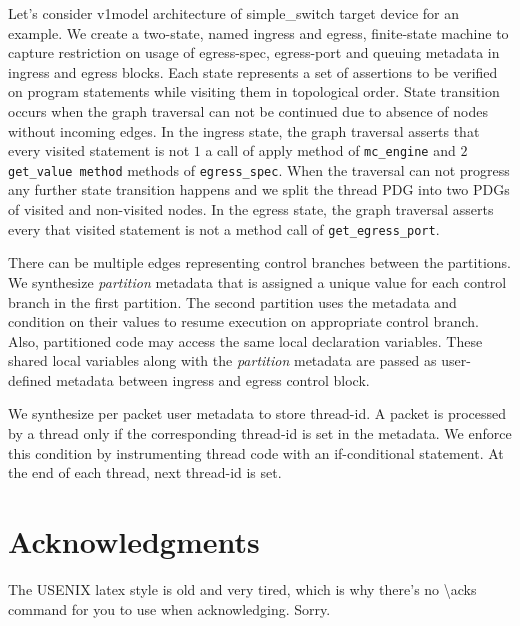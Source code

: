 Let's consider v1model architecture of simple\_switch target device for an example.
We create a two-state, named ingress and egress, finite-state machine to capture restriction on usage of egress-spec, egress-port and queuing metadata in ingress and egress blocks.
Each state represents a set of assertions to be verified on program statements while visiting them in topological order.
State transition occurs when the graph traversal can not be continued due to absence of nodes without incoming edges.
In the ingress state, the graph traversal asserts that every visited statement is not $1$ a call of apply method of \texttt{mc\_engine}  and $2$ \texttt{get\_value method} methods of \texttt{egress\_spec}.
When the traversal can not progress any further state transition happens and we split the thread PDG into two PDGs of visited and non-visited nodes.
In the egress state, the graph traversal asserts every that visited statement is not a method call of \texttt{get\_egress\_port}.

There can be multiple edges representing control branches between the partitions.
We synthesize \emph{partition} metadata that is assigned a unique value for each control branch in the first partition.
The second partition uses the metadata and condition on their values to resume execution on appropriate control branch.
Also, partitioned code may access the same local declaration variables.
These shared local variables along with the \emph{partition} metadata are passed as user-defined metadata between ingress and egress control block.

We synthesize per packet user metadata to store thread-id.
A packet is processed by a thread only if the corresponding thread-id is set in the metadata. 
We enforce this condition by instrumenting thread code with an if-conditional statement.
At the end of each thread, next thread-id is set.





\section*{Acknowledgments}

The USENIX latex style is old and very tired, which is why
there's no \textbackslash{}acks command for you to use when
acknowledging. Sorry.

